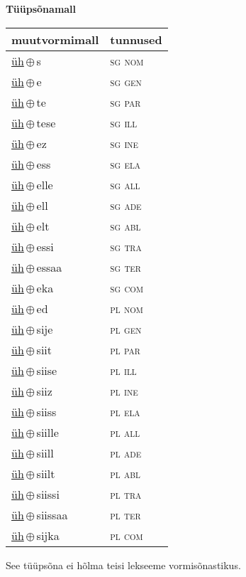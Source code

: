 

\vspace{3.5em}
\noindent \begin{minipage}{\textwidth}
\noindent \textbf{Tüüpsõnamall \,}\\

\begin{sideways}
\begin{tabular}{l l}
muutvormimall & tunnused \\
\hline
\underline{üh}\,$\oplus$\,s & \textsc{ sg nom } \\
\underline{üh}\,$\oplus$\,e & \textsc{ sg gen } \\
\underline{üh}\,$\oplus$\,te & \textsc{ sg par } \\
\underline{üh}\,$\oplus$\,tese & \textsc{ sg ill } \\
\underline{üh}\,$\oplus$\,ez & \textsc{ sg ine } \\
\underline{üh}\,$\oplus$\,ess & \textsc{ sg ela } \\
\underline{üh}\,$\oplus$\,elle & \textsc{ sg all } \\
\underline{üh}\,$\oplus$\,ell & \textsc{ sg ade } \\
\underline{üh}\,$\oplus$\,elt & \textsc{ sg abl } \\
\underline{üh}\,$\oplus$\,essi & \textsc{ sg tra } \\
\underline{üh}\,$\oplus$\,essaa & \textsc{ sg ter } \\
\underline{üh}\,$\oplus$\,eka & \textsc{ sg com } \\
\underline{üh}\,$\oplus$\,ed & \textsc{ pl nom } \\
\underline{üh}\,$\oplus$\,sije & \textsc{ pl gen } \\
\underline{üh}\,$\oplus$\,siit & \textsc{ pl par } \\
\underline{üh}\,$\oplus$\,siise & \textsc{ pl ill } \\
\underline{üh}\,$\oplus$\,siiz & \textsc{ pl ine } \\
\underline{üh}\,$\oplus$\,siiss & \textsc{ pl ela } \\
\underline{üh}\,$\oplus$\,siille & \textsc{ pl all } \\
\underline{üh}\,$\oplus$\,siill & \textsc{ pl ade } \\
\underline{üh}\,$\oplus$\,siilt & \textsc{ pl abl } \\
\underline{üh}\,$\oplus$\,siissi & \textsc{ pl tra } \\
\underline{üh}\,$\oplus$\,siissaa & \textsc{ pl ter } \\
\underline{üh}\,$\oplus$\,sijka & \textsc{ pl com } \\
\end{tabular}
\end{sideways}
\label{tab:tüüpsõnamall-ühs}

\end{minipage}

 
\vspace{1em}
\noindent See tüüpsõna ei hõlma teisi lekseeme vormi\-sõnastikus.
